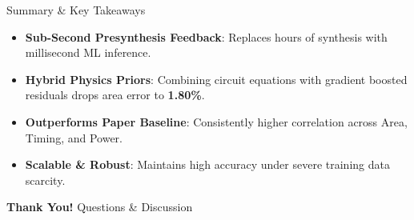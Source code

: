 \documentclass[aspectratio=169,10pt]{beamer}
\begin{document}
\begin{frame}{Summary \& Key Takeaways}
    \begin{itemize}\setlength{\itemsep}{12pt}
        \item \textbf{Sub-Second Presynthesis Feedback}: Replaces hours of synthesis with millisecond ML inference.
        \item \textbf{Hybrid Physics Priors}: Combining circuit equations with gradient boosted residuals drops area error to \textbf{1.80\%}.
        \item \textbf{Outperforms Paper Baseline}: Consistently higher correlation across Area, Timing, and Power.
        \item \textbf{Scalable \& Robust}: Maintains high accuracy under severe training data scarcity.
    \end{itemize}
    \vfill
    \begin{center}
        \textbf{\color{SageGreen}Thank You!} \hspace{0.5cm} Questions \& Discussion
    \end{center}
\end{frame}
\end{document}
